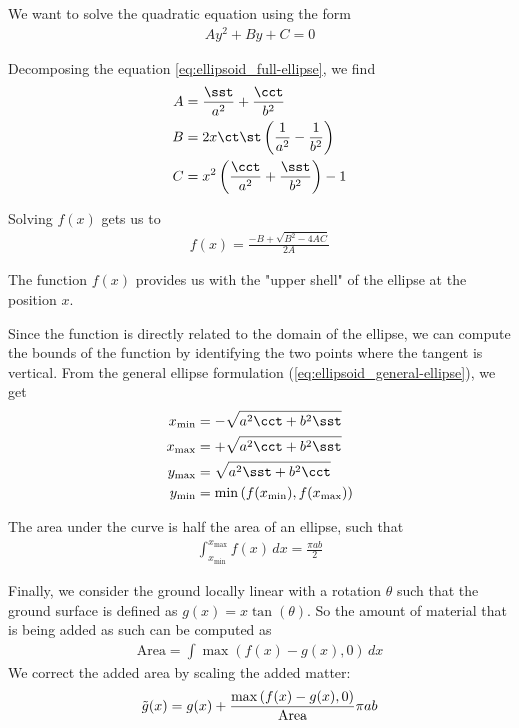 We want to solve the quadratic equation using the form 
\begin{align}
    Ay^2 + By + C = 0
\end{align}

Decomposing the equation \eqref{eq:ellipsoid_full-ellipse}, we find
\begin{align}
    A &= \frac{\sst}{a^2} + \frac{\cct}{b^2} \\
    B &= 2x \ct \st \left( \frac{1}{a^2} - \frac{1}{b^2} \right) \\
    C &= x^2 \left( \frac{\cct}{a^2} + \frac{\sst}{b^2} \right) - 1
\end{align}


Solving $f(x)$ gets us to 
\begin{align}
    \label{eq:ellipsoid_final-ellipse}
    f(x) = \frac{-B + \sqrt{B^2 - 4 A C}}{2 A}
\end{align}

The function $f(x)$ provides us with the "upper shell" of the ellipse at the position $x$.

Since the function is directly related to the domain of the ellipse, we can compute the bounds of the function by identifying the two points where the tangent is vertical. From the general ellipse formulation (\eqref{eq:ellipsoid_general-ellipse}), we get 
\begin{align}
    \label{eq:ellipsoid_ellipse-bounds}
    x_{\text{min}} &= -\sqrt{a^2 \cct + b^2 \sst} \\
    x_{\text{max}} &= +\sqrt{a^2 \cct + b^2 \sst} \\
    y_{\text{max}} &= \sqrt{a^2 \sst + b^2 \cct} \\
    y_{\text{min}} &= \min\left( f(x_{\text{min}}), f(x_{\text{max}}) \right)
\end{align}

The area under the curve is half the area of an ellipse, such that 
\begin{align}
    \int_{x_{\text{min}}}^{x_{\text{max}}} f(x) \,dx = \frac{\pi a b}{2}
\end{align}

Finally, we consider the ground locally linear with a rotation $\theta$ such that the ground surface is defined as $g(x) = x \tan(\theta)$. So the amount of material that is being added as such can be computed as 
\begin{align}
    \text{Area} = \int \max \left( f(x) - g(x), 0 \right) \, dx
\end{align}
We correct the added area by scaling the added matter:
\begin{align}
    \Tilde{g}(x) = g(x) + \frac{\max \left( f(x) - g(x), 0 \right)}{\text{Area}} \pi a b
\end{align}










